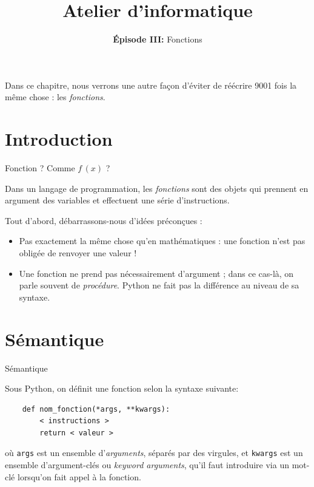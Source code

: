 \documentclass[10pt,xcolor={dvipsnames}]{beamer}
\title{Atelier d'informatique}
\subtitle{\textbf{Épisode III:} Fonctions}
\begin{document}
\begin{frame}
\titlepage
\pause

Dans ce chapitre, nous verrons une autre façon d'éviter de réécrire 9001 fois la même chose : les \textit{fonctions}.
\end{frame}

\frame{\tableofcontents}

\section{Introduction}

\begin{frame}[fragile]{Fonction ? Comme $f\,(x)$ ?}

Dans un langage de programmation, les \textit{fonctions} sont des objets qui prennent en argument des variables et effectuent une série d'instructions.
\pause
\vspace{1em}

Tout d'abord, débarrassons-nous d'idées préconçues :
\pause

\begin{itemize}[<+->]
\item Pas exactement la même chose qu'en mathématiques : une fonction n'est pas obligée de renvoyer une valeur !
\item Une fonction ne prend pas nécessairement d'argument ; dans ce cas-là, on parle souvent de \textit{procédure}. Python ne fait pas la différence au niveau de sa syntaxe.
\end{itemize}

\end{frame}

\section{Sémantique}

\begin{frame}[fragile]{Sémantique}

	Sous Python, on définit une fonction selon la syntaxe suivante:\pause
	\begin{lstlisting}
	def nom_fonction(*args, **kwargs):
	    < instructions >
	    return < valeur >
	    \end{lstlisting}
	\pause
	où \lstinline|args| est un ensemble d'\textit{arguments}, séparés par des virgules, et \lstinline|kwargs| est un ensemble d'argument-clés ou \textit{keyword arguments}, qu'il faut introduire via un mot-clé lorsqu'on fait appel à la fonction.
\end{frame}
\end{document}
